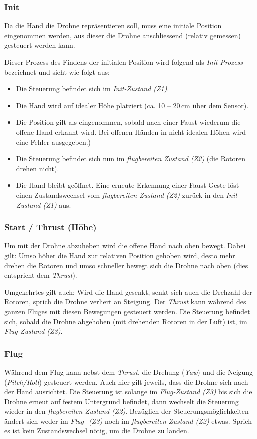 \subsubsection{Init}
\label{sec:concept:init}
Da die Hand die Drohne repräsentieren soll, muss eine initiale Position eingenommen werden, aus dieser die Drohne anschliessend (relativ gemessen) gesteuert werden kann.

Dieser Prozess des Findens der initialen Position wird folgend als \textit{Init-Prozess} bezeichnet und sieht wie folgt aus:

\begin{itemize}
	\item Die Steuerung befindet sich im \textit{Init-Zustand (Z1)}.
	\item Die Hand wird auf idealer Höhe platziert (ca. 10 -- 20\,cm über dem Sensor).
	\item Die Position gilt als eingenommen, sobald nach einer Faust wiederum die offene Hand erkannt wird. Bei offenen Händen in nicht idealen Höhen wird eine Fehler ausgegeben.)
	\item Die Steuerung befindet sich nun im \textit{flugbereiten Zustand (Z2)} (die Rotoren drehen nicht).
	\item Die Hand bleibt geöffnet. Eine erneute Erkennung einer Faust-Geste löst einen Zustandswechsel vom \textit{flugbereiten Zustand (Z2)} zurück in den \textit{Init-Zustand (Z1)} aus.
\end{itemize}

\subsubsection{Start / Thrust (Höhe)}
Um mit der Drohne abzuheben wird die offene Hand nach oben bewegt.
Dabei gilt: Umso höher die Hand zur relativen Position gehoben wird, desto mehr drehen die Rotoren und umso schneller bewegt sich die Drohne nach oben (dies entspricht dem \textit{Thrust}).

Umgekehrtes gilt auch: Wird die Hand gesenkt, senkt sich auch die Drehzahl der Rotoren, sprich die Drohne verliert an Steigung.
Der \textit{Thrust} kann während des ganzen Fluges mit diesen Bewegungen gesteuert werden.
Die Steuerung befindet sich, sobald die Drohne abgehoben (mit drehenden Rotoren in der Luft) ist, im \textit{Flug-Zustand (Z3)}.

\subsubsection{Flug}
Während dem Flug kann nebst dem \textit{Thrust}, die Drehung (\textit{Yaw}) und die Neigung (\textit{Pitch/Roll}) gesteuert werden.
Auch hier gilt jeweils, dass die Drohne sich nach der Hand ausrichtet.
Die Steuerung ist solange im \textit{Flug-Zustand (Z3)} bis sich die Drohne erneut auf festem Untergrund befindet, dann wechselt die Steuerung wieder in den \textit{flugbereiten Zustand (Z2)}.
Bezüglich der Steuerungsmöglichkeiten ändert sich weder im \textit{Flug- (Z3)} noch im \textit{flugbereiten Zustand (Z2)} etwas.
Sprich es ist kein Zustandswechsel nötig, um die Drohne zu landen.


